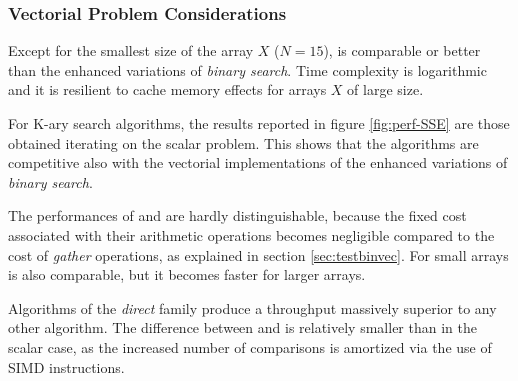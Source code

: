 \documentclass[preprint,1p,times]{elsarticle}
\begin{document}
\subsubsection{Vectorial Problem Considerations}

Except for the smallest size of the array $X$ ($N=15$), \textit{\MKLName} is comparable or better than the enhanced variations of \textit{binary search}. Time complexity is logarithmic and it is resilient to cache memory effects for arrays $X$ of large size.

For {K-ary search} algorithms, the results reported in figure \ref{fig:perf-SSE} are those obtained iterating on the scalar problem. This shows that the algorithms are competitive also with the vectorial implementations of the enhanced variations of \textit{binary search}.

The performances of \textit{\ClassicOffsetName} and \textit{\BitSetName} are hardly distinguishable, because the fixed cost associated with their arithmetic operations becomes negligible compared to the cost of \textit{gather} operations, as explained in section \ref{sec:testbinvec}. For small arrays \textit{\EytzingerName} is also comparable, but it becomes faster for larger arrays.

Algorithms of the \textit{direct} family produce a throughput massively superior to any other algorithm. The difference between \textit{\DirectName} and \textit{\DirectGapName} is relatively smaller than in the scalar case, as the increased number of comparisons is amortized via the use of SIMD instructions. 
\end{document}
